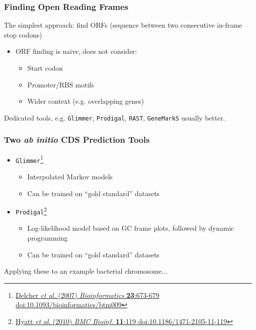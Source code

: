 \begin{frame}
  \frametitle{Finding Open Reading Frames}
  The simplest approach: find ORFs (sequence between two consecutive in-frame stop codons)
  \begin{itemize}
    \item<1-> ORF finding is naive, does not consider:
    \begin{itemize}
      \item Start codon
      \item Promoter/RBS motifs
      \item Wider context (e.g. overlapping genes)
    \end{itemize}
  \end{itemize}
  Dedicated tools, e.g. \texttt{Glimmer}, \texttt{Prodigal}, \texttt{RAST}, \texttt{GeneMarkS} usually better.
\end{frame}

\begin{frame}
  \frametitle{Two \textit{ab initio} CDS Prediction Tools}
  \begin{itemize}
    \item \texttt{Glimmer}\footnote{\tiny{\href{http://dx.doi.org/10.1093/bioinformatics/btm009}{Delcher \textit{et al}. (2007) \textit{Bioinformatics} \textbf{23}:673-679 doi:10.1093/bioinformatics/btm009}}}
    \begin{itemize}
      \item Interpolated Markov models
      \item Can be trained on ``gold standard'' datasets
    \end{itemize}
    \item \texttt{Prodigal}\footnote{\tiny{\href{http://dx.doi.org/10.1186/1471-2105-11-119}{Hyatt \textit{et al}. (2010) \textit{BMC Bioinf.} \textbf{11}:119 doi:10.1186/1471-2105-11-119}}}
    \begin{itemize}
      \item Log-likelihood model based on GC frame plots, followed by dynamic programming
      \item Can be trained on ``gold standard'' datasets
    \end{itemize}
  \end{itemize}
  Applying these to an example bacterial chromosome$\ldots$
\end{frame}


